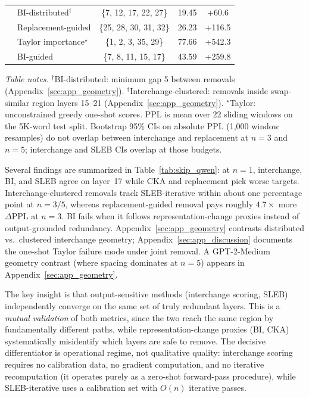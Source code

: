 \documentclass{article}
\newenvironment{tabhere}{%
  \par\medskip
  \begin{center}
}{%
  \end{center}
  \medskip
}
\begin{document}
\begin{tabhere}
{\begin{tabular}{clccc}
& BI-distributed$^\dag$ & \{7, 12, 17, 22, 27\} & 19.45 & +60.6 \\
& Replacement-guided & \{25, 28, 30, 31, 32\} & 26.23 & +116.5 \\
& Taylor importance$^{\star}$ & \{1, 2, 3, 35, 29\} & 77.66 & +542.3 \\
& BI-guided & \{7, 8, 11, 15, 17\} & 43.59 & +259.8 \\
\bottomrule
\end{tabular}}%
\label{tab:skip_qwen}
\end{tabhere}
\noindent\small \textit{Table notes.} $^\dag$BI-distributed: minimum gap 5 between removals (Appendix~\ref{sec:app_geometry}). $^\ddag$Interchange-clustered: removals inside swap-similar region layers 15--21 (Appendix~\ref{sec:app_geometry}). $^{\star}$Taylor: unconstrained greedy one-shot scores. PPL is mean over 22 sliding windows on the 5K-word test split. Bootstrap 95\% CIs on absolute PPL (1{,}000 window resamples) do not overlap between interchange and replacement at $n{=}3$ and $n{=}5$; interchange and SLEB CIs overlap at those budgets.

Several findings are summarized in Table~\ref{tab:skip_qwen}: at $n{=}1$, interchange, BI, and SLEB agree on layer~17 while CKA and replacement pick worse targets. Interchange-clustered removals track SLEB-iterative within about one percentage point at $n{=}3/5$, whereas replacement-guided removal pays roughly $4.7\times$ more $\Delta$PPL at $n{=}3$. BI fails when it follows representation-change proxies instead of output-grounded redundancy. Appendix~\ref{sec:app_geometry} contrasts distributed vs.\ clustered interchange geometry; Appendix~\ref{sec:app_discussion} documents the one-shot Taylor failure mode under joint removal. A GPT-2-Medium geometry contrast (where spacing dominates at $n{=}5$) appears in Appendix~\ref{sec:app_geometry}.

The key insight is that output-sensitive methods (interchange scoring, SLEB) independently converge on the same set of truly redundant layers. This is a \emph{mutual validation} of both metrics, since the two reach the same region by fundamentally different paths, while representation-change proxies (BI, CKA) systematically misidentify which layers are safe to remove. The decisive differentiator is operational regime, not qualitative quality: interchange scoring requires no calibration data, no gradient computation, and no iterative recomputation (it operates purely as a zero-shot forward-pass procedure), while SLEB-iterative uses a calibration set with $O(n)$ iterative passes.
\end{document}
